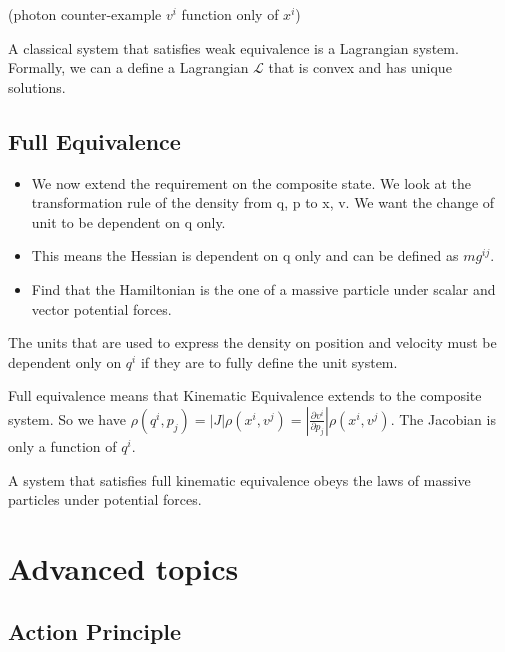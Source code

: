\documentclass{article}
\begin{document}
(photon counter-example $v^i$ function only of $x^i$)

\begin{prop}
	A classical system that satisfies weak equivalence is a Lagrangian system. Formally, we can a define a Lagrangian $\mathcal{L}$ that is convex and has unique solutions.
\end{prop}

\subsection{Full Equivalence}

\begin{itemize}
	\item We now extend the requirement on the composite state. We look at the transformation rule of the density from q, p to x, v. We want the change of unit to be dependent on q only.
	
	\item This means the Hessian is dependent on q only and can be defined as $m g^{ij}$.
	
	\item Find that the Hamiltonian is the one of a massive particle under scalar and vector potential forces.
\end{itemize}

The units that are used to express the density on position and velocity must be dependent only on $q^i$ if they are to fully define the unit system.

\begin{defn}
	Full equivalence means that Kinematic Equivalence extends to the composite system. So we have $\rho(q^i,p_j) = \left|J\right|\rho(x^i,v^j) = \left|\frac{\partial v^i}{\partial p_j}\right|\rho(x^i,v^j)$. The Jacobian is only a function of $q^i$.
\end{defn}

\begin{prop}
	A system that satisfies full kinematic equivalence obeys the laws of massive particles under potential forces.
\end{prop}

\section{Advanced topics}

\subsection{Action Principle}
\end{document}
